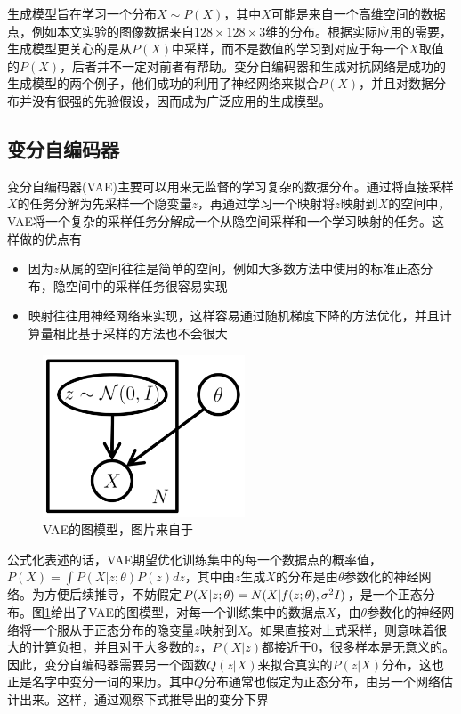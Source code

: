 \documentclass[UTF8,openany,AutoFakeBold,AutoFakeSlant,cs4size]{ctexbook}
\begin{document}
生成模型旨在学习一个分布$X \sim P(X)$，其中$X$可能是来自一个高维空间的数据点，例如本文实验的图像数据来自$128 \times 128 \times 3$维的分布。根据实际应用的需要，生成模型更关心的是从$P(X)$中采样，而不是数值的学习到对应于每一个$X$取值的$P(X)$，后者并不一定对前者有帮助。变分自编码器和生成对抗网络是成功的生成模型的两个例子，他们成功的利用了神经网络来拟合$P(X)$，并且对数据分布并没有很强的先验假设，因而成为广泛应用的生成模型。

\subsection{变分自编码器}

变分自编码器(VAE)\cite{kingma2014autoencoding}主要可以用来无监督的学习复杂的数据分布。通过将直接采样$X$的任务分解为先采样一个隐变量$z$，再通过学习一个映射将$z$映射到$X$的空间中，VAE将一个复杂的采样任务分解成一个从隐空间采样和一个学习映射的任务。这样做的优点有
\begin{itemize}
	\item 因为$z$从属的空间往往是简单的空间，例如大多数方法中使用的标准正态分布，隐空间中的采样任务很容易实现
	\item 映射往往用神经网络来实现，这样容易通过随机梯度下降的方法优化，并且计算量相比基于采样的方法也不会很大
\end{itemize}

\begin{figure}
\centering
\includegraphics[width=6cm]{./images/vae_model.png}
\caption{VAE的图模型，图片来自于\cite{doersch2016tutorial}}
\label{vae_model}
\end{figure}

公式化表述的话，VAE期望优化训练集中的每一个数据点的概率值，$P(X) = \int P(X | z; \theta) P(z) dz$，其中由$z$生成$X$的分布是由$\theta$参数化的神经网络。为方便后续推导，不妨假定$P(X | z; \theta) = N(X | f(z; \theta), \sigma^2 \* I)$，是一个正态分布。图\ref{vae_model}给出了VAE的图模型，对每一个训练集中的数据点$X$，由$\theta$参数化的神经网络将一个服从于正态分布的隐变量$z$映射到$X$。如果直接对上式采样，则意味着很大的计算负担，并且对于大多数的$z$，$P(X|z)$都接近于$0$，很多样本是无意义的。因此，变分自编码器需要另一个函数$Q(z|X)$来拟合真实的$P(z|X)$分布，这也正是名字中变分一词的来历。其中$Q$分布通常也假定为正态分布，由另一个网络估计出来。这样，通过观察下式推导出的变分下界
\end{document}
